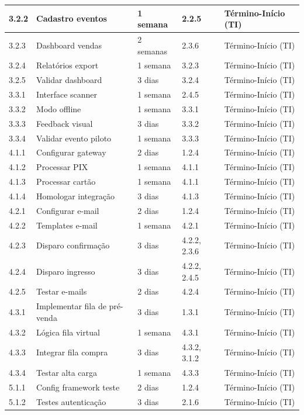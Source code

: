 \begin{table}[H]
\begin{tabular}{|p{1cm}|p{5cm}|p{2cm}|p{1.5cm}|p{3cm}|}
3.2.2 & Cadastro eventos & 1 semana & 2.2.5 & Término-Início (TI) \\ \hline
3.2.3 & Dashboard vendas & 2 semanas & 2.3.6 & Término-Início (TI) \\ \hline
3.2.4 & Relatórios export & 1 semana & 3.2.3 & Término-Início (TI) \\ \hline
3.2.5 & Validar dashboard & 3 dias & 3.2.4 & Término-Início (TI) \\ \hline
3.3.1 & Interface scanner & 1 semana & 2.4.5 & Término-Início (TI) \\ \hline
3.3.2 & Modo offline & 1 semana & 3.3.1 & Término-Início (TI) \\ \hline
3.3.3 & Feedback visual & 3 dias & 3.3.2 & Término-Início (TI) \\ \hline
3.3.4 & Validar evento piloto & 1 semana & 3.3.3 & Término-Início (TI) \\ \hline
4.1.1 & Configurar gateway & 2 dias & 1.2.4 & Término-Início (TI) \\ \hline
4.1.2 & Processar PIX & 1 semana & 4.1.1 & Término-Início (TI) \\ \hline
4.1.3 & Processar cartão & 1 semana & 4.1.1 & Término-Início (TI) \\ \hline
4.1.4 & Homologar integração & 3 dias & 4.1.3 & Término-Início (TI) \\ \hline
4.2.1 & Configurar e-mail & 2 dias & 1.2.4 & Término-Início (TI) \\ \hline
4.2.2 & Templates e-mail & 1 semana & 4.2.1 & Término-Início (TI) \\ \hline
4.2.3 & Disparo confirmação & 3 dias & 4.2.2, 2.3.6 & Término-Início (TI) \\ \hline
4.2.4 & Disparo ingresso & 3 dias & 4.2.2, 2.4.5 & Término-Início (TI) \\ \hline
4.2.5 & Testar e-mails & 2 dias & 4.2.4 & Término-Início (TI) \\ \hline
4.3.1 & Implementar fila de pré-venda & 3 dias & 1.3.1 & Término-Início (TI) \\ \hline
4.3.2 & Lógica fila virtual & 1 semana & 4.3.1 & Término-Início (TI) \\ \hline
4.3.3 & Integrar fila compra & 3 dias & 4.3.2, 3.1.2 & Término-Início (TI) \\ \hline
4.3.4 & Testar alta carga & 1 semana & 4.3.3 & Término-Início (TI) \\ \hline
5.1.1 & Config framework teste & 2 dias & 1.2.4 & Término-Início (TI) \\ \hline
5.1.2 & Testes autenticação & 3 dias & 2.1.6 & Término-Início (TI) \\ \hline

\end{tabular}
\end{table}
